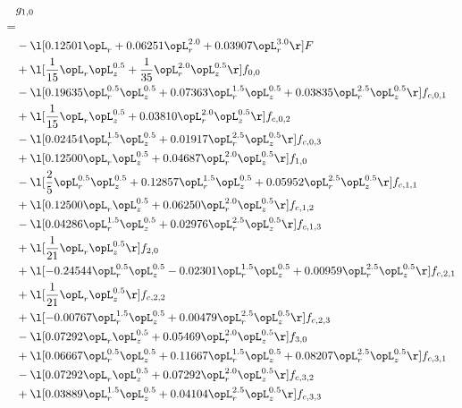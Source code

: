 \begin{alignat}{2} 
\label{eq:g_10_0} 
& g_{1,0} \nonumber \\ 
 = \\ 
& - \l[  0.12501 \opL_r +  0.06251 \opL_r^{2.0} +  0.03907 \opL_r^{3.0}  \r] F \nonumber \\ 
& + \l[ \frac{1}{15} \opL_r \opL_z^{0.5} + \frac{1}{35} \opL_r^{2.0} \opL_z^{0.5}  \r] f_{0,0} \nonumber \\ 
& - \l[  0.19635 \opL_r^{0.5} \opL_z^{0.5} +  0.07363 \opL_r^{1.5} \opL_z^{0.5} +  0.03835 \opL_r^{2.5} \opL_z^{0.5}  \r] f_{c,0,1} \nonumber \\ 
& + \l[ \frac{1}{15} \opL_r \opL_z^{0.5} +  0.03810 \opL_r^{2.0} \opL_z^{0.5}  \r] f_{c,0,2} \nonumber \\ 
& - \l[  0.02454 \opL_r^{1.5} \opL_z^{0.5} +  0.01917 \opL_r^{2.5} \opL_z^{0.5}  \r] f_{c,0,3} \nonumber \\ 
& + \l[  0.12500 \opL_r \opL_z^{0.5} +  0.04687 \opL_r^{2.0} \opL_z^{0.5}  \r] f_{1,0} \nonumber \\ 
& - \l[ \frac{2}{5} \opL_r^{0.5} \opL_z^{0.5} +  0.12857 \opL_r^{1.5} \opL_z^{0.5} +  0.05952 \opL_r^{2.5} \opL_z^{0.5}  \r] f_{c,1,1} \nonumber \\ 
& + \l[  0.12500 \opL_r \opL_z^{0.5} +  0.06250 \opL_r^{2.0} \opL_z^{0.5}  \r] f_{c,1,2} \nonumber \\ 
& - \l[  0.04286 \opL_r^{1.5} \opL_z^{0.5} +  0.02976 \opL_r^{2.5} \opL_z^{0.5}  \r] f_{c,1,3} \nonumber \\ 
& + \l[ \frac{1}{21} \opL_r \opL_z^{0.5}  \r] f_{2,0} \nonumber \\ 
& + \l[  -0.24544 \opL_r^{0.5} \opL_z^{0.5}   -0.02301 \opL_r^{1.5} \opL_z^{0.5} +  0.00959 \opL_r^{2.5} \opL_z^{0.5}  \r] f_{c,2,1} \nonumber \\ 
& + \l[ \frac{1}{21} \opL_r \opL_z^{0.5}  \r] f_{c,2,2} \nonumber \\ 
& + \l[  -0.00767 \opL_r^{1.5} \opL_z^{0.5} +  0.00479 \opL_r^{2.5} \opL_z^{0.5}  \r] f_{c,2,3} \nonumber \\ 
& - \l[  0.07292 \opL_r \opL_z^{0.5} +  0.05469 \opL_r^{2.0} \opL_z^{0.5}  \r] f_{3,0} \nonumber \\ 
& + \l[  0.06667 \opL_r^{0.5} \opL_z^{0.5} +  0.11667 \opL_r^{1.5} \opL_z^{0.5} +  0.08207 \opL_r^{2.5} \opL_z^{0.5}  \r] f_{c,3,1} \nonumber \\ 
& - \l[  0.07292 \opL_r \opL_z^{0.5} +  0.07292 \opL_r^{2.0} \opL_z^{0.5}  \r] f_{c,3,2} \nonumber \\ 
& + \l[  0.03889 \opL_r^{1.5} \opL_z^{0.5} +  0.04104 \opL_r^{2.5} \opL_z^{0.5}  \r] f_{c,3,3} \nonumber \\ 
\end{alignat} 



